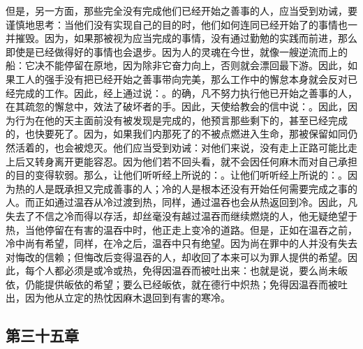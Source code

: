 但是，另一方面，那些完全没有完成他们已经开始之善事的人，应当受到劝诫，要谨慎地思考：当他们没有实现自己的目的时，他们如何连同已经开始了的事情也一并摧毁。因为，如果那被视为应当完成的事情，没有通过勤勉的实践而前进，那么即使是已经做得好的事情也会退步。因为人的灵魂在今世，就像一艘逆流而上的船：它决不能停留在原地，因为除非它奋力向上，否则就会漂回最下游。因此，如果工人的强手没有把已经开始之善事带向完美，那么工作中的懈怠本身就会反对已经完成的工作。因此，经上通过说：。的确，凡不努力执行他已开始之善事的人，在其疏忽的懈怠中，效法了破坏者的手。因此，天使给教会的信中说：。因此，因为行为在他的天主面前没有被发现是完成的，他预言那些剩下的，甚至已经完成的，也快要死了。因为，如果我们内那死了的不被点燃进入生命，那被保留如同仍然活着的，也会被熄灭。他们应当受到劝诫：对他们来说，没有走上正路可能比走上后又转身离开更能容忍。因为他们若不回头看，就不会因任何麻木而对自己承担的目的变得软弱。那么，让他们听听经上所说的：。让他们听听经上所说的：。因为热的人是既承担又完成善事的人；冷的人是根本还没有开始任何需要完成之事的人。而正如通过温吞从冷过渡到热，同样，通过温吞也会从热返回到冷。因此，凡失去了不信之冷而得以存活，却丝毫没有越过温吞而继续燃烧的人，他无疑绝望于热，当他停留在有害的温吞中时，他正走上变冷的道路。但是，正如在温吞之前，冷中尚有希望，同样，在冷之后，温吞中只有绝望。因为尚在罪中的人并没有失去对悔改的信赖；但悔改后变得温吞的人，却收回了本来可以为罪人提供的希望。因此，每个人都必须是或冷或热，免得因温吞而被吐出来：也就是说，要么尚未皈依，仍能提供皈依的希望；要么已经皈依，就在德行中炽热；免得因温吞而被吐出，因为他从立定的热忱因麻木退回到有害的寒冷。\par


\subsection{第三十五章}

\par

